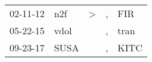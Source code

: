 \begin{supertabular}{p{0.07\textwidth}p{0.06\textwidth}p{0.02\textwidth}p{0.02\textwidth}p{0.06\textwidth}}
 02-11-12\textsuperscript{} &   n2f\textsuperscript{} &  \textgreater &  , &   FIR\textsuperscript{} \\
 05-22-15\textsuperscript{} &  vdol\textsuperscript{} &               &  , &  tran\textsuperscript{} \\
 09-23-17\textsuperscript{} &  SUSA\textsuperscript{} &               &  , &  KITC\textsuperscript{} \\
\end{supertabular}
